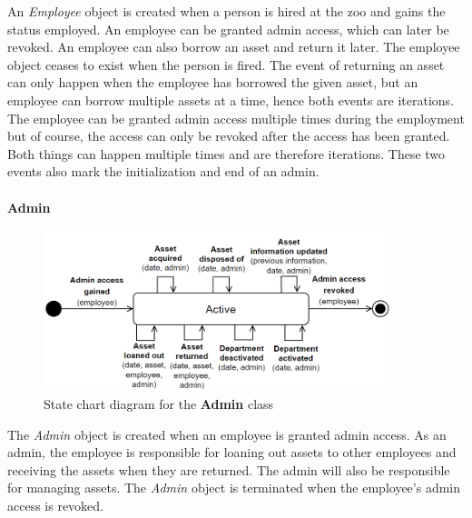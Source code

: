 An \textit{Employee} object is created when a person is hired at the zoo and gains the status employed. An employee can be granted admin access, which can later be revoked. An employee can also borrow an asset and return it later. The employee object ceases to exist when the person is fired. The event of returning an asset can only happen when the employee has borrowed the given asset, but an employee can borrow multiple assets at a time, hence both events are iterations.\\
The employee can be granted admin access multiple times during the employment but of course, the access can only be revoked after the access has been granted. Both things can happen multiple times and are therefore iterations. These two events also mark the initialization and end of an admin.
\\\\

\large{\textbf{Admin}}
\begin{figure}[H]
    \centering
    \includegraphics[width=0.9\textwidth]{figures/StateCharts/Admin_state_chart.png}
    \caption{State chart diagram for the \textbf{Admin} class}
    \label{fig:admin_statechart}
\end{figure}

The \textit{Admin} object is created when an employee is granted admin access. As an admin, the employee is responsible for loaning out assets to other employees and receiving the assets when they are returned. The admin will also be responsible for managing assets. The \textit{Admin} object is terminated when the employee's admin access is revoked.
\\\\



